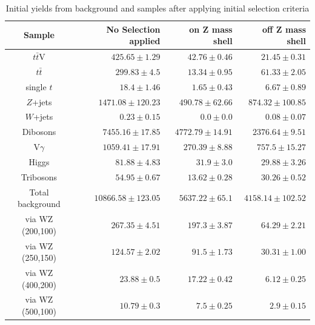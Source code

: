 \begin{table}[H]
\begin{center}
\begin{tabular}{c r r r}
\toprule
Sample& No Selection applied& on Z mass shell& off Z mass shell\\

\midrule
$t\bar{t}$V& $ 425.65 \pm 1.29 $& $ 42.76 \pm 0.46 $& $ 21.45 \pm 0.31 $\\

$t\bar{t}$& 	 $299.83\pm 4.5$& 	 $13.34\pm 0.95$& 	 $61.33\pm 2.05$\\

single $t$& 	 $18.4\pm 1.46$& 	 $1.65\pm 0.43$& 	 $6.67\pm 0.89$\\

$Z$+jets& 	 $1471.08\pm 120.23$& 	 $490.78\pm 62.66$& 	 $874.32\pm 100.85$\\

$W$+jets& 	 $0.23\pm 0.15$& 	 $0.0\pm 0.0$& 	 $0.08\pm 0.07$\\

Dibosons& 	 $7455.16\pm 17.85$& 	 $4772.79\pm 14.91$& 	 $2376.64\pm 9.51$\\


V$\gamma$& 	 $1059.41\pm 17.91$& 	 $270.39\pm 8.88$& 	 $757.5\pm 15.27$\\

Higgs& 	 $81.88\pm 4.83$& 	 $31.9\pm 3.0$& 	 $29.88\pm 3.26$\\

Tribosons& 	 $54.95\pm 0.67$& 	 $13.62\pm 0.28$& 	 $30.26\pm 0.52$\\

\hline
Total background& 	 $10866.58\pm123.05$& 	 $5637.22\pm65.1$& 	 $4158.14\pm102.52$\\

\hline\hline
via WZ (200,100)& 	 $267.35\pm 4.51$& 	 $197.3\pm 3.87$& 	 $64.29\pm 2.21$\\

via WZ (250,150)& 	 $124.57\pm 2.02$& 	 $91.5\pm 1.73$& 	 $30.31\pm 1.00$\\

via WZ (400,200)& 	 $23.88\pm 0.5$& 	 $17.22\pm 0.42$& 	 $6.12\pm 0.25$\\

via WZ (500,100)& 	 $10.79\pm 0.3$& 	 $7.5\pm 0.25$& 	 $2.9\pm 0.15$\\
\bottomrule
\end{tabular}
\end{center}
\caption{Initial yields from background and samples after applying initial selection criteria}
\label{tab:preselection}
\end{table}

